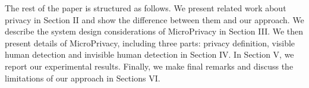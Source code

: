 The rest of the paper is structured as follows.
We present  related work about privacy in Section II and show the difference between them and our approach.
We describe the system design considerations of MicroPrivacy  in  Section III.
We then present details of MicroPrivacy, including three parts: privacy definition, visible human detection and invisible human detection in Section IV.
In Section V,  we report our  experimental results.
Finally, we make final remarks and discuss the limitations of our approach in Sections VI. 


